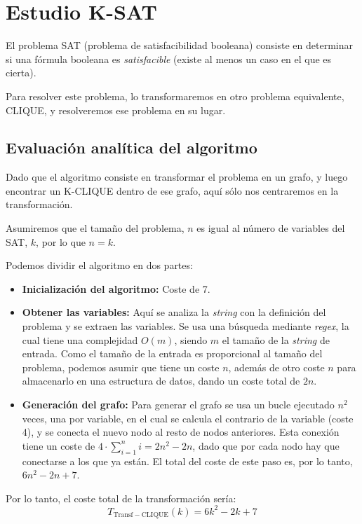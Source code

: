 \section{Estudio K-SAT}
El problema SAT (problema de satisfacibilidad booleana) \parencite{gu1999algorithms} consiste en determinar si una fórmula booleana es \textit{satisfacible} (existe al menos un caso en el que es cierta).

Para resolver este problema, lo transformaremos en otro problema equivalente, CLIQUE, y resolveremos ese problema en su lugar.


\subsection*{Evaluación analítica del algoritmo}
Dado que el algoritmo consiste en transformar el problema en un grafo, y luego encontrar un K-CLIQUE dentro de ese grafo, aquí sólo nos centraremos en la transformación.

Asumiremos que el tamaño del problema, $n$ es igual al número de variables del SAT, $k$, por lo que $n=k$.

Podemos dividir el algoritmo en dos partes:
\begin{itemize}
  \item \textbf{Inicialización del algoritmo:} Coste de 7.
  \item \textbf{Obtener las variables:} Aquí se analiza la \textit{string} con la definición del problema y se extraen las variables. Se usa una búsqueda mediante \textit{regex}, la cual tiene una complejidad $O(m)$, siendo $m$ el tamaño de la \textit{string} de entrada. Como el tamaño de la entrada es proporcional al tamaño del problema, podemos asumir que tiene un coste $n$, además de otro coste $n$ para almacenarlo en una estructura de datos, dando un coste total de $2n$.
  \item \textbf{Generación del grafo:} Para generar el grafo se usa un bucle ejecutado $n^2$ veces, una por variable, en el cual se calcula el contrario de la variable (coste 4), y se conecta el nuevo nodo al resto de nodos anteriores. Esta conexión tiene un coste de $4\cdot\sum_{i=1}^{n}{i}=2n^2-2n$, dado que por cada nodo hay que conectarse a los que ya están. El total del coste de este paso es, por lo tanto, $6n^2-2n+7$.
\end{itemize}

Por lo tanto, el coste total de la transformación sería:
\begin{equation}
  T_{\mathrm{Transf-CLIQUE}}(k) = 6k^2 - 2k + 7
\end{equation}


